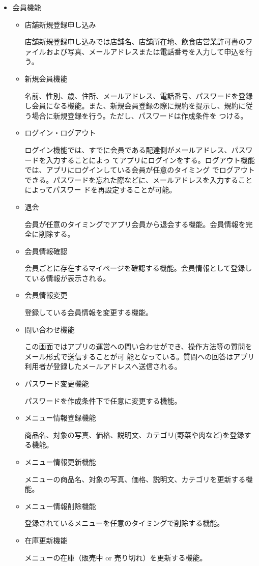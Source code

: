 \begin{itemize}
  \item 会員機能
    \begin{itemize}
        \item 店舗新規登録申し込み
        
        店舗新規登録申し込みでは店舗名、店舗所在地、飲食店営業許可書のファイルおよび写真、メールアドレスまたは電話番号を入力して申込を行う。

        \item 新規会員機能
        
        名前、性別、歳、住所、メールアドレス、電話番号、パスワードを登録し会員になる機能。また、新規会員登録の際に規約を提示し、規約に従う場合に新規登録を行う。ただし、パスワードは作成条件を つける。
        \item ログイン・ログアウト
        
        ログイン機能では、すでに会員である配達側がメールアドレス、パスワードを入力することによっ てアプリにログインをする。ログアウト機能では、アプリにログインしている会員が任意のタイミング でログアウトできる。パスワードを忘れた際などに、メールアドレスを入力することによってパスワー ドを再設定することが可能。
        \item 退会
        
        会員が任意のタイミングでアプリ会員から退会する機能。会員情報を完全に削除する。
        \item 会員情報確認
        
        会員ごとに存在するマイページを確認する機能。会員情報として登録している情報が表示される。
        \item 会員情報変更
        
        登録している会員情報を変更する機能。
        \item 問い合わせ機能
        
        この画面ではアプリの運営への問い合わせができ、操作方法等の質問をメール形式で送信することが可 能となっている。質問への回答はアプリ利用者が登録したメールアドレスへ送信される。
        \item パスワード変更機能
        
        パスワードを作成条件下で任意に変更する機能。
        \item メニュー情報登録機能
        
        商品名、対象の写真、価格、説明文、カテゴリ(野菜や肉など)を登録する機能。
        \item メニュー情報更新機能
        
        メニューの商品名、対象の写真、価格、説明文、カテゴリを更新する機能。
        \item メニュー情報削除機能
        
        登録されているメニューを任意のタイミングで削除する機能。

        \item 在庫更新機能
        
        メニューの在庫（販売中 or 売り切れ）を更新する機能。
    \end{itemize}
  
\end{itemize}

